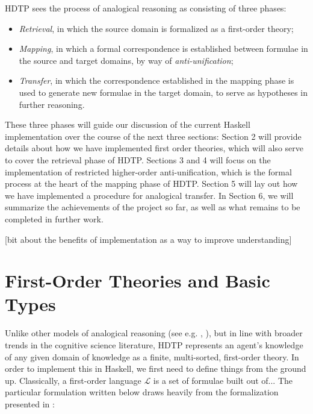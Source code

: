 \documentclass[12pt,a4paper]{article}
\begin{document}
HDTP sees the process of analogical reasoning as consisting of three phases: 
\begin{itemize}
    \item \textit{Retrieval}, in which the source domain is formalized as a first-order theory;
    \item \textit{Mapping}, in which a formal correspondence is established between formulae in the source and target domains, by way of \textit{anti-unification};
    \item \textit{Transfer}, in which the correspondence established in the mapping phase is used to generate new formulae in the target domain, to serve as hypotheses in further reasoning.
\end{itemize} 

These three phases will guide our discussion of the current Haskell implementation over the course of the next three sections: Section 2 will provide details about how we have implemented first order theories, which will also serve to cover the retrieval phase of HDTP. Sections 3 and 4 will focus on the implementation of restricted higher-order anti-unification, which is the formal process at the heart of the mapping phase of HDTP. Section 5 will lay out how we have implemented a procedure for analogical transfer. In Section 6, we will summarize the achievements of the project so far, as well as what remains to be completed in further work.
% 

[bit about the benefits of implementation as a way to improve understanding]

\section{First-Order Theories and Basic Types}

Unlike other models of analogical reasoning (see e.g. \cite{Hofstadter1995TheCP}, \cite{Gentner1983StructureMappingAT}), but in line with broader trends in the cognitive science literature, HDTP represents an agent's knowledge of any given domain of knowledge as a finite, multi-sorted, first-order theory. In order to implement this in Haskell, we first need to define things from the ground up.  
% 
Classically, a first-order language $\mathcal{L}$ is a set of formulae built out of... The particular formulation written below draws heavily from the formalization presented in \cite{Schwering2009SyntacticPO}:
\end{document}
